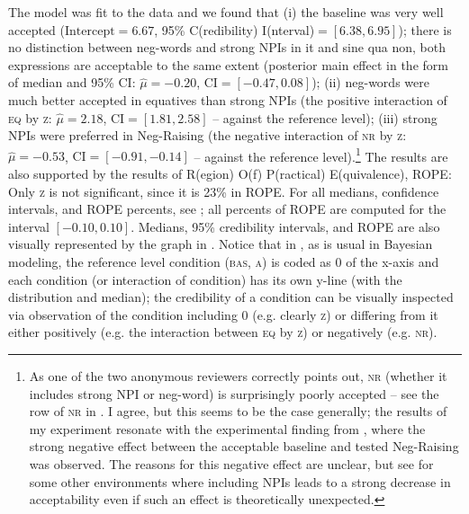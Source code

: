 \documentclass[output=paper,colorlinks,citecolor=brown]{langscibook}
\begin{document}
The model was fit to the data and we found that (i) the baseline was very well accepted ($\mathrm{Intercept}=6.67$, 95\% C(redibility) I(nterval)$=[6.38, 6.95]$); there is no distinction between neg-words and strong NPIs in it and sine qua non, both expressions are acceptable to the same extent (posterior main effect in the form of median and 95\% CI: $\hat{\mu}=-0.20$, $\mathrm{CI}=[-0.47, 0.08]$); (ii) neg-words were much better accepted in equatives than strong NPIs (the positive interaction of \textsc{eq} by \textsc{z}: $\hat{\mu}=2.18$, $\mathrm{CI}=[1.81, 2.58]$ -- against the reference level); (iii) strong NPIs were preferred in Neg-Raising (the negative interaction of \textsc{nr} by \textsc{z}: $\hat{\mu}=-0.53$, $\mathrm{CI}=[-0.91, -0.14]$ -- against the reference level).\footnote{As one of the two anonymous reviewers correctly points out, \textsc{nr} (whether it includes strong NPI or neg-word) is surprisingly poorly accepted -- see the row of \textsc{nr} in . I agree, but this seems to be the case generally; the results of my experiment resonate with the experimental finding from \citet{dovcekal2016experimentala}, where the strong negative effect between the acceptable baseline and tested Neg-Raising was observed. The reasons for this negative effect are unclear, but see \citet{alexandropoulou2020there} for some other environments where including NPIs leads to a strong decrease in acceptability even if such an effect is theoretically unexpected.}
The results are also supported by the results of R(egion) O(f) P(ractical) E(quivalence), ROPE: Only \textsc{z} is not significant, since it is 23\% in ROPE. For all medians, confidence intervals, and ROPE percents, see ; all percents of ROPE are computed for the interval $[-0.10, 0.10]$. Medians, 95\% credibility intervals, and ROPE are also visually represented by the graph in . Notice that in , as is usual in Bayesian modeling, the reference level condition (\textsc{bas, a}) is coded as 0 of the x-axis and each condition (or interaction of condition) has its own y-line (with the distribution and median); the credibility of a condition can be visually inspected via observation of the condition including 0 (e.g. clearly \textsc{z}) or differing from it either positively (e.g. the interaction between \textsc{eq} by \textsc{z}) or negatively (e.g. \textsc{nr}).
\end{document}
